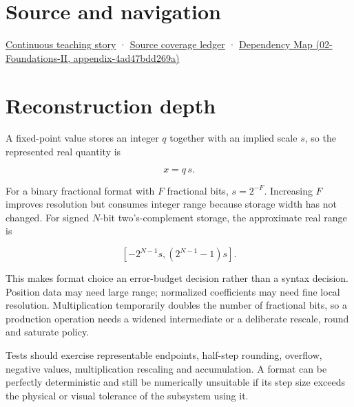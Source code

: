 \section{Source and navigation}\label{appendix-ceb4c4a9b5a1-source-and-navigation}

\href{Continuous\%20Notes/Computing\%20Foundations\%20-\%20From\%20Bits\%20to\%20C++\%20and\%20Systems\%20APIs\#Choosing\%20what\%20information\%20to\%20keep}{Continuous teaching story} · \hyperref[appendix-fd090d982a15]{Source coverage ledger} · \href{../02-Foundations-II/main.pdf\#nameddest=appendix-4ad47bdd269a}{Dependency Map (02-Foundations-II, appendix-4ad47bdd269a)}

\section{Reconstruction depth}\label{appendix-ceb4c4a9b5a1-reconstruction-depth}

A fixed-point value stores an integer \(q\) together with an implied scale \(s\), so the represented real quantity is

\[
x=q\,s.
\]

For a binary fractional format with \(F\) fractional bits, \(s=2^{-F}\). Increasing \(F\) improves resolution but consumes integer range because storage width has not changed. For signed \(N\)-bit two's-complement storage, the approximate real range is

\[
[-2^{N-1}s,(2^{N-1}-1)s].
\]

This makes format choice an error-budget decision rather than a syntax decision. Position data may need large range; normalized coefficients may need fine local resolution. Multiplication temporarily doubles the number of fractional bits, so a production operation needs a widened intermediate or a deliberate rescale, round and saturate policy.

Tests should exercise representable endpoints, half-step rounding, overflow, negative values, multiplication rescaling and accumulation. A format can be perfectly deterministic and still be numerically unsuitable if its step size exceeds the physical or visual tolerance of the subsystem using it.
